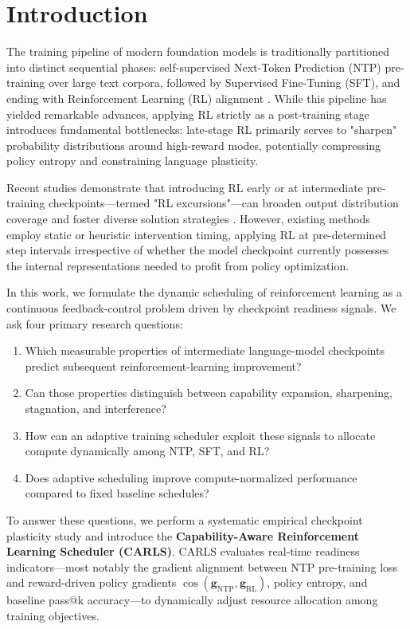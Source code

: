 \section{Introduction}
\label{sec:intro}

The training pipeline of modern foundation models is traditionally partitioned into distinct sequential phases: self-supervised Next-Token Prediction (NTP) pre-training over large text corpora, followed by Supervised Fine-Tuning (SFT), and ending with Reinforcement Learning (RL) alignment \citep{bansal2026rl, huang2025reinforcement}. While this pipeline has yielded remarkable advances, applying RL strictly as a post-training stage introduces fundamental bottlenecks: late-stage RL primarily serves to "sharpen" probability distributions around high-reward modes, potentially compressing policy entropy and constraining language plasticity.

Recent studies demonstrate that introducing RL early or at intermediate pre-training checkpoints—termed "RL excursions"—can broaden output distribution coverage and foster diverse solution strategies \citep{bansal2026rl}. However, existing methods employ static or heuristic intervention timing, applying RL at pre-determined step intervals irrespective of whether the model checkpoint currently possesses the internal representations needed to profit from policy optimization.

In this work, we formulate the dynamic scheduling of reinforcement learning as a continuous feedback-control problem driven by checkpoint readiness signals. We ask four primary research questions:
\begin{enumerate}
    \item Which measurable properties of intermediate language-model checkpoints predict subsequent reinforcement-learning improvement?
    \item Can those properties distinguish between capability expansion, sharpening, stagnation, and interference?
    \item How can an adaptive training scheduler exploit these signals to allocate compute dynamically among NTP, SFT, and RL?
    \item Does adaptive scheduling improve compute-normalized performance compared to fixed baseline schedules?
\end{enumerate}

To answer these questions, we perform a systematic empirical checkpoint plasticity study and introduce the \textbf{Capability-Aware Reinforcement Learning Scheduler (CARLS)}. CARLS evaluates real-time readiness indicators—most notably the gradient alignment between NTP pre-training loss and reward-driven policy gradients $\cos(\mathbf{g}_{\text{NTP}}, \mathbf{g}_{\text{RL}})$, policy entropy, and baseline pass@k accuracy—to dynamically adjust resource allocation among training objectives.
